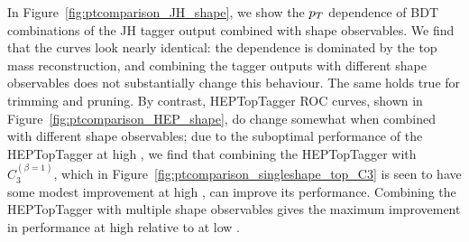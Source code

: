 In Figure~\ref{fig:ptcomparison_JH_shape}, we show the $p_T$ dependence of BDT combinations of the JH tagger output combined with shape observables. We find that the curves look nearly identical: the \pt dependence is dominated by the top mass reconstruction, and combining the tagger outputs with different shape observables does not substantially change this behaviour. The same holds true for trimming and pruning. By contrast,  HEPTopTagger ROC curves, shown in Figure~\ref{fig:ptcomparison_HEP_shape}, do change somewhat when combined with different shape observables; due to the suboptimal performance of the HEPTopTagger at high \pt, we find that combining the HEPTopTagger with $C_3^{(\beta=1)}$, which in Figure~\ref{fig:ptcomparison_singleshape_top_C3} is seen to have some modest improvement at high \pt, can improve its performance. Combining the HEPTopTagger with multiple shape observables gives the maximum improvement in performance at high \pt relative to at low \pt.\\

